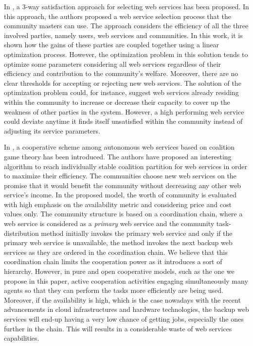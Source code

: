 \documentclass[11pt,onecolumn]{IEEEtran}
\begin{document}
{In \cite{DBLP:conf/IEEEscc/LimTMB12}, a 3-way satisfaction approach
for selecting web services has been proposed. In this approach,
the authors proposed a web service selection process that the
community masters can use. The approach considers the efficiency
of all the three involved parties, namely users, web services and
communities. In this work, it is shown how the gains of these
parties are coupled together using a linear optimization process.
However, the optimization problem in this solution tends to
optimize some parameters considering all web services regardless
of their efficiency and contribution to the community's welfare.
Moreover, there are no clear thresholds for accepting or rejecting
new web services. The solution of the optimization problem could,
for instance, suggest web services already residing within the
community to increase or decrease their capacity to cover up the
weakness of other parties in the system. However, a high
performing web service could deviate anytime it finds itself
unsatisfied within the community instead of adjusting its service
parameters.

In \cite{10.1109/TSC.2012.12}, a cooperative scheme among
autonomous web services based on coalition game theory has been
introduced. The authors have proposed an interesting algorithm to
reach individually stable coalition partition for web services in
order to maximize their efficiency. The communities choose new web
services on the promise that it would benefit the community
without decreasing any other web service's income. In the proposed
model, the worth of community is evaluated with high emphasis on
the availability metric and considering price and cost values
only. The community structure is based on a coordination chain,
where a web service is considered as a \emph{primary} web service
and the community task-distribution method initially invokes the
primary web service and only if the primary web service is
unavailable, the method invokes the next backup web services as
they are ordered in the coordination chain. We believe that this
coordination chain limits the cooperation power as it introduces a
sort of hierarchy. However, in pure and open cooperative models,
such as the one we propose in this paper, active cooperation
activities engaging simultaneously many agents so that they can
perform the tasks more efficiently are being used. Moreover, if
the availability is high, which is the case nowadays with the
recent advancements in cloud infrastructures and hardware technologies, the
backup web services will end-up having a very low chance of
getting jobs, especially the ones further in the chain. This will
results in a considerable waste of web services capabilities.

}
\end{document}
